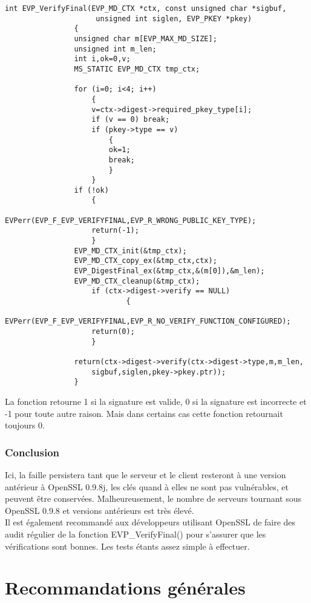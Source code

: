 		
			\begin{lstlisting}[style=customc,caption=EVP\_VerifyFinal.c, label=evp]
				int EVP_VerifyFinal(EVP_MD_CTX *ctx, const unsigned char *sigbuf,
				     unsigned int siglen, EVP_PKEY *pkey)
				{
				unsigned char m[EVP_MAX_MD_SIZE];
				unsigned int m_len;
				int i,ok=0,v;
				MS_STATIC EVP_MD_CTX tmp_ctx;

				for (i=0; i<4; i++)
					{
					v=ctx->digest->required_pkey_type[i];
					if (v == 0) break;
					if (pkey->type == v)
						{
						ok=1;
						break;
						}
					}
				if (!ok)
					{
					EVPerr(EVP_F_EVP_VERIFYFINAL,EVP_R_WRONG_PUBLIC_KEY_TYPE);
					return(-1);
					}
				EVP_MD_CTX_init(&tmp_ctx);
				EVP_MD_CTX_copy_ex(&tmp_ctx,ctx);     
				EVP_DigestFinal_ex(&tmp_ctx,&(m[0]),&m_len);
				EVP_MD_CTX_cleanup(&tmp_ctx);
			        if (ctx->digest->verify == NULL)
			                {
					EVPerr(EVP_F_EVP_VERIFYFINAL,EVP_R_NO_VERIFY_FUNCTION_CONFIGURED);
					return(0);
					}

				return(ctx->digest->verify(ctx->digest->type,m,m_len,
					sigbuf,siglen,pkey->pkey.ptr));
				}
			\end{lstlisting}     

			La fonction retourne 1 si la signature est valide, 0 si la signature est incorrecte et -1 pour toute autre raison. Mais dans certains cas cette fonction retournait toujours 0.
	
		\subsubsection{Conclusion}

			Ici, la faille persistera tant que le serveur et le client resteront à une version antérieur à OpenSSL 0.9.8j, les clés quand à elles ne sont pas vulnérables, et peuvent être conservées. Malheureusement, le nombre de serveurs tournant sous OpenSSL 0.9.8 et versions antérieurs est très élevé.\\

			Il est également recommandé aux développeurs utilisant OpenSSL de faire des audit régulier de la fonction EVP\_VerifyFinal() pour s'assurer que les vérifications sont bonnes. Les tests étants assez simple à effectuer.

\section{Recommandations générales}